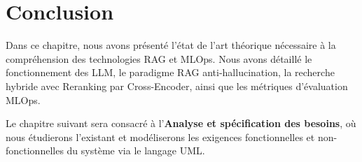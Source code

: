 \section{Conclusion}
Dans ce chapitre, nous avons présenté l'état de l'art théorique nécessaire à la compréhension des technologies RAG et MLOps. Nous avons détaillé le fonctionnement des LLM, le paradigme RAG anti-hallucination, la recherche hybride avec Reranking par Cross-Encoder, ainsi que les métriques d'évaluation MLOps.

Le chapitre suivant sera consacré à l'\textbf{Analyse et spécification des besoins}, où nous étudierons l'existant et modéliserons les exigences fonctionnelles et non-fonctionnelles du système via le langage UML.
